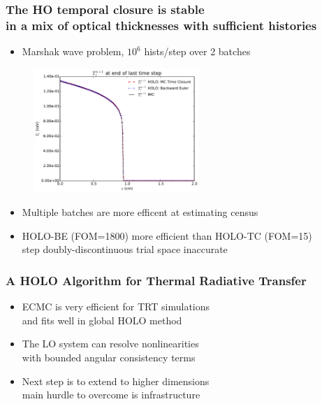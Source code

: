\documentclass[xcolor=dvipsnames,hyperref={pdfpagelabels=false},unknownkeysallowed]{beamer}
\newcommand{\colG}[1]{{\color{Gray!110} #1}}
\newlength{\wideitemsep}
\let\olditem\item
\renewcommand{\item}{\setlength{\itemsep}{\wideitemsep}\olditem}
\newcommand{\shorttitle}{\color{black} A HOLO Algorithm for Thermal Radiative Transfer
    \makebox[\linewidth]{\rule{\textwidth}{5pt}}
}
\begin{document}
\begin{frame}
    \frametitle{The HO temporal closure is stable \\ in a mix of optical thicknesses with
    sufficient histories}
{\addtolength{\leftmargini}{-0.2in}
    \fontsize{9.0pt}{10.0pt}\selectfont
    \vspace{0.1in}
    \begin{itemize}
        \item Marshak wave problem, $10^6$ hists/step over 2 batches
    \end{itemize}
            \begin{figure}[H]
    \centering
    \includegraphics[width=0.56\textwidth]{marshak_time_cont_compare.pdf}
\end{figure}
\begin{itemize}
    \item Multiple batches are more efficent at estimating census
    \item HOLO-BE (FOM=1800) more efficient than HOLO-TC (FOM=15)
        \\ \colG{step doubly-discontinuous trial space inaccurate}
    \end{itemize}
}
\end{frame}

\begin{frame}
    \frametitle{\shorttitle}
    \begin{itemize}
        \item[] ECMC is very efficient for TRT simulations\\
            \colG{and fits well in global HOLO method}
        \item[] The LO system can resolve nonlinearities \\
            \colG{with bounded angular consistency terms}
        \item[] Next step is to extend to higher dimensions \\
            \colG{main hurdle to overcome is infrastructure}
    \end{itemize}
\end{frame}
\end{document}

